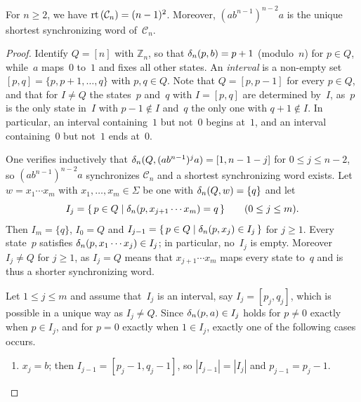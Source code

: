 \begin{theorem}
	\label{intro:cerny_rt}
	For $n \ge 2$, we have $\operatorname{rt}{(\mathcal C_n)} = (n-1)^2$.
	Moreover, $(ab^{n-1})^{n-2}a$ is the unique shortest synchronizing word
	of~$\mathcal C_n$.
\end{theorem}
\begin{proof}
	Identify $Q = [n]$ with $\mathbb Z_n$, so that $\delta_n(p,b) = p+1$
	(modulo~$n$) for $p \in Q$, while~$a$ maps~$0$ to~$1$ and fixes all other states.
	An \emph{interval} is a non-empty set $[p,q] = \{p, p+1, \ldots, q\}$ with $p,q \in Q$.
	Note that $Q = [p,p-1]$ for every $p \in Q$, and that for $I \ne Q$ the states~$p$
	and~$q$ with $I = [p,q]$ are determined by~$I$, as~$p$ is the only state in~$I$
	with $p - 1 \notin I$ and~$q$ the only one with $q + 1 \notin I$.
	In particular, an interval containing~$1$ but not~$0$ begins at~$1$,
	and an interval containing~$0$ but not~$1$ ends at~$0$.
	 \label{def:interval}
	
	One verifies inductively that $\delta_n(Q,(ab^{n-1})^{j}a) = [1,n-1-j]$
	for $0 \le j \le n-2$, so $(ab^{n-1})^{n-2}a$ synchronizes $\mathcal C_n$
	and a shortest synchronizing word exists.
	Let $w = x_1 \cdots x_m$ with $x_1, \ldots, x_m \in \Sigma$ be one
	with $\delta_n(Q,w) = \{q\}$ and let
	\[
	I_j = \{\, p \in Q \mid \delta_n(p,x_{j+1} \cdots x_m) = q \,\}
	\qquad (0 \le j \le m).
	\]
	Then $I_m = \{q\}$, $I_0 = Q$ and
	$I_{j-1} = \{\, p \in Q \mid \delta_n(p,x_j) \in I_j \,\}$ for $j \ge 1$.
	Every state~$p$ satisfies $\delta_n(p,x_1 \cdots x_j) \in I_j$;
	in particular, no~$I_j$ is empty.
	Moreover $I_j \ne Q$ for $j \ge 1$, as $I_j = Q$ means that
	$x_{j+1} \cdots x_m$ maps every state to~$q$ and is thus a shorter synchronizing word.
	
	Let $1 \le j \le m$ and assume that~$I_j$ is an interval, say $I_j = [p_j, q_j]$,
	which is possible in a unique way as $I_j \ne Q$.
	Since $\delta_n(p,a) \in I_j$ holds for $p \ne 0$ exactly when
	$p \in I_j$, and for $p = 0$ exactly when $1 \in I_j$, exactly one of the following
	cases occurs.
	\begin{enumerate}%
		\item $x_j = b$; then $I_{j-1} = [p_j - 1, q_j - 1]$, so $|I_{j-1}| = |I_j|$
		and $p_{j-1} = p_j - 1$.
		

\end{enumerate}
\end{proof}
